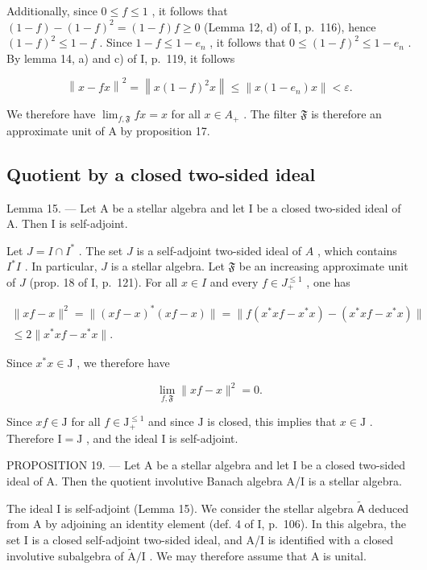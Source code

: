 Additionally, since \(0 \leqslant f \leqslant 1\) , it follows that \((1-f)-(1-f)^{2} = (1-f)f \geqslant 0\) (Lemma 12, d) of I, p.~116), hence \((1-f)^{2} \leqslant 1-f\) . Since \(1-f \leqslant 1-e_{n}\) , it follows that \(0 \leqslant (1-f)^{2} \leqslant 1-e_{n}\) . By lemma 14, a) and c) of I, p.~119, it follows

\[
\left\| x - f x \right\| ^ {2} = \left\| x (1 - f) ^ {2} x \right\| \leqslant \left\| x (1 - e _ {n}) x \right\| <   \varepsilon .
\]

We therefore have \(\lim_{f,\mathfrak{F}}fx = x\) for all \(x \in A_{+}\) . The filter \(\mathfrak{F}\) is therefore an approximate unit of A by proposition 17.

\subsection{Quotient by a closed two-sided ideal}

Lemma 15. --- Let A be a stellar algebra and let I be a closed two-sided ideal of A. Then I is self-adjoint.

Let \(J = I \cap I^*\) . The set \(J\) is a self-adjoint two-sided ideal of \(A\) , which contains \(I^*I\) . In particular, \(J\) is a stellar algebra. Let \(\mathfrak{F}\) be an increasing approximate unit of \(J\) (prop. 18 of I, p.~121). For all \(x \in I\) and every \(f \in J_{+}^{\leqslant 1}\) , one has

\[
\begin{array}{c} \| x f - x \| ^ {2} = \| (x f - x) ^ {*} (x f - x) \| = \| f (x ^ {*} x f - x ^ {*} x) - (x ^ {*} x f - x ^ {*} x) \| \\ \leqslant 2 \| x ^ {*} x f - x ^ {*} x \|. \end{array}
\]

Since \(x^{*}x\in \mathrm{J}\) , we therefore have

\[
\lim _ {f, \mathfrak {F}} \| x f - x \| ^ {2} = 0.
\]

Since \(xf \in \mathrm{J}\) for all \(f \in \mathrm{J}_{+}^{\leqslant 1}\) and since \(\mathrm{J}\) is closed, this implies that \(x \in \mathrm{J}\) . Therefore \(\mathrm{I} = \mathrm{J}\) , and the ideal \(\mathrm{I}\) is self-adjoint.

PROPOSITION 19. --- Let A be a stellar algebra and let I be a closed two-sided ideal of A. Then the quotient involutive Banach algebra A/I is a stellar algebra.

The ideal I is self-adjoint (Lemma 15). We consider the stellar algebra \(\widetilde{\mathsf{A}}\) deduced from A by adjoining an identity element (def. 4 of I, p.~106). In this algebra, the set I is a closed self-adjoint two-sided ideal, and A/I is identified with a closed involutive subalgebra of \(\widetilde{\mathrm{A}}/\mathrm{I}\) . We may therefore assume that A is unital.

